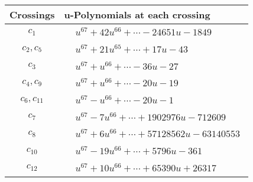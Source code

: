 \documentclass[1p]{elsarticle_modified}
\theoremstyle{definition}
\begin{document}
\begin{tabular}{m{50pt}|m{274pt}}
Crossings & \hspace{64pt}u-Polynomials at each crossing \\
\hline $$\begin{aligned}c_{1}\end{aligned}$$&$\begin{aligned}
&u^{67}+42 u^{66}+\cdots-24651 u-1849
\end{aligned}$\\
\hline $$\begin{aligned}c_{2},c_{5}\end{aligned}$$&$\begin{aligned}
&u^{67}+21 u^{65}+\cdots+17 u-43
\end{aligned}$\\
\hline $$\begin{aligned}c_{3}\end{aligned}$$&$\begin{aligned}
&u^{67}+u^{66}+\cdots-36 u-27
\end{aligned}$\\
\hline $$\begin{aligned}c_{4},c_{9}\end{aligned}$$&$\begin{aligned}
&u^{67}+u^{66}+\cdots-20 u-19
\end{aligned}$\\
\hline $$\begin{aligned}c_{6},c_{11}\end{aligned}$$&$\begin{aligned}
&u^{67}- u^{66}+\cdots-20 u-1
\end{aligned}$\\
\hline $$\begin{aligned}c_{7}\end{aligned}$$&$\begin{aligned}
&u^{67}-7 u^{66}+\cdots+1902976 u-712609
\end{aligned}$\\
\hline $$\begin{aligned}c_{8}\end{aligned}$$&$\begin{aligned}
&u^{67}+6 u^{66}+\cdots+57128562 u-63140553
\end{aligned}$\\
\hline $$\begin{aligned}c_{10}\end{aligned}$$&$\begin{aligned}
&u^{67}-19 u^{66}+\cdots+5796 u-361
\end{aligned}$\\
\hline $$\begin{aligned}c_{12}\end{aligned}$$&$\begin{aligned}
&u^{67}+10 u^{66}+\cdots+65390 u+26317
\end{aligned}$\\
\hline
\end{tabular}\\~\\
\end{document}
